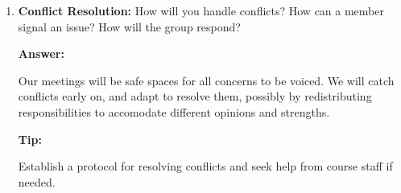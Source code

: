 \documentclass[12pt]{article}
\newenvironment{answer}[1][]{
  \color{blue}\textbf{Answer:}
}{}
\newenvironment{alice}[1][]{
  \color{black}\textbf{Tip:}
}{}
\begin{document}
\begin{enumerate}
\begin{alice}

Communicate struggles early and work together to find solutions.
\end{alice}

\item {\bf Conflict Resolution:} How will you handle conflicts? How can a member signal an issue? How will the group respond?

\begin{answer}
  Our meetings will be safe spaces for all concerns to be voiced. We will catch conflicts early on, and adapt to resolve them, possibly by redistributing responsibilities to accomodate different opinions and strengths.
\end{answer}

\begin{alice}

Establish a protocol for resolving conflicts and seek help from course staff if needed.
\end{alice}

\end{enumerate}
\end{document}

